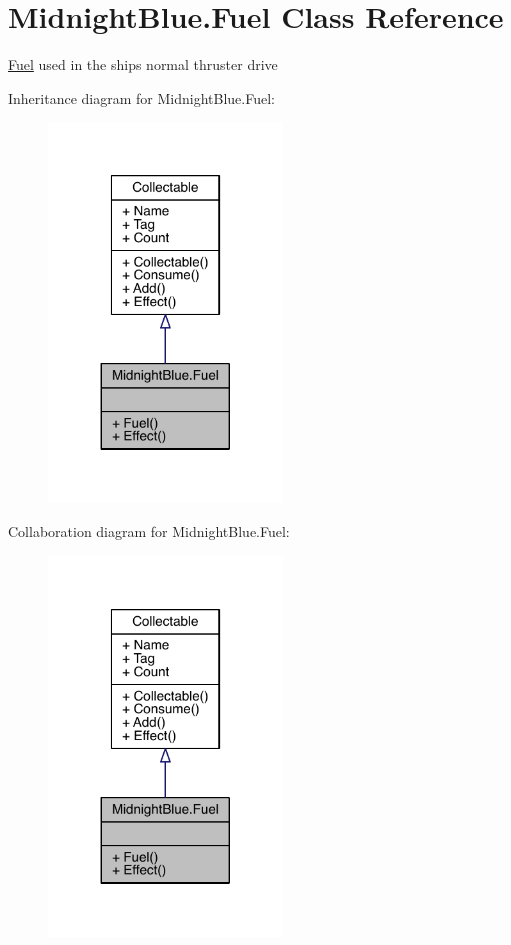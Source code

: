 \hypertarget{class_midnight_blue_1_1_fuel}{}\section{Midnight\+Blue.\+Fuel Class Reference}
\label{class_midnight_blue_1_1_fuel}


\hyperlink{class_midnight_blue_1_1_fuel}{Fuel} used in the ships normal thruster drive  




Inheritance diagram for Midnight\+Blue.\+Fuel\+:
\nopagebreak
\begin{figure}[H]
\begin{center}
\leavevmode
\includegraphics[width=176pt]{class_midnight_blue_1_1_fuel__inherit__graph}
\end{center}
\end{figure}


Collaboration diagram for Midnight\+Blue.\+Fuel\+:
\nopagebreak
\begin{figure}[H]
\begin{center}
\leavevmode
\includegraphics[width=176pt]{class_midnight_blue_1_1_fuel__coll__graph}
\end{center}
\end{figure}
